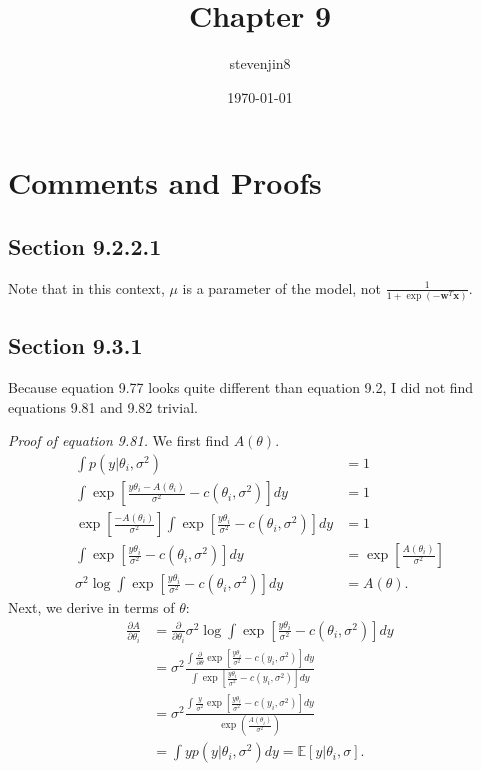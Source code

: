 \documentclass[a4paper,11pt]{article}
\title{Chapter 9}
\author{stevenjin8}
\date{\today}
\begin{document}
\maketitle

\section*{Comments and Proofs}
\subsection*{Section 9.2.2.1}
Note that in this context, $\mu$ is a parameter of the model,
not $\frac{1}{1+\exp(-\mathbf{w}^T\mathbf{x})}$.

\subsection*{Section 9.3.1}
Because equation 9.77 looks quite different than equation 9.2, I did not find
equations 9.81 and 9.82 trivial.

\textit{Proof of equation 9.81.} We first find $A(\theta)$.
\begin{align*}
    \int p( y|\theta_i, \sigma^2 ) &= 1 \\
    \int \exp\left[
        \frac{ y\theta_i - A(\theta_i) }{ \sigma^2 } - c(\theta_i, \sigma^2)
    \right]dy &= 1 \\
    \exp\left[ \frac{ -A(\theta_i) }{ \sigma^2 }\right]
    \int \exp\left[
        \frac{ y\theta_i }{ \sigma^2 } - c( \theta_i, \sigma^2 )
    \right]dy
    &= 1 \\
    \int \exp\left[
        \frac{ y\theta_i }{ \sigma^2 } - c( \theta_i, \sigma^2 )
    \right]dy
    &= \exp\left[ \frac{ A( \theta_i ) }{ \sigma^2 }\right] \\
    \sigma^2\log\int \exp\left[
        \frac{ y\theta_i }{ \sigma^2 } - c( \theta_i, \sigma^2 )
    \right]dy &= A( \theta ).
\end{align*}
Next, we derive in terms of $\theta$:
\begin{align*}
    \frac{ \partial A }{ \partial \theta_i }
    &= \frac{ \partial }{ \partial \theta_i }
    \sigma^2\log\int \exp\left[
        \frac{ y\theta_i }{ \sigma^2 } - c( \theta_i, \sigma^2 )
    \right]dy \\
    &= \sigma^2 \frac{
        \int \frac{ \partial }{ \partial\theta }\exp\left[
            \frac{ y\theta_i }{ \sigma^2 } - c( y_i, \sigma^2 )
        \right]dy
    }{
        \int \exp\left[
            \frac{ y\theta_i }{ \sigma^2 } - c( y_i, \sigma^2 )
        \right]dy
    } \\
    &= \sigma^2 \frac{
        \int \frac{ y }{ \sigma^2 } \exp\left[
            \frac{ y\theta_i }{ \sigma^2 } - c( y_i, \sigma^2 )
        \right]dy
    }{
        \exp( \frac{ A( \theta_i )}{ \sigma^2 })
    } \\
    &= \int y p( y|\theta_i, \sigma^2 ) dy = \mathbb{E}[ y|\theta_i, \sigma ].
\end{align*}
\end{document}
